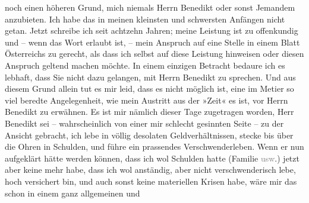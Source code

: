 \begin{ledgroupsized}[t]{13cm}
               noch einen höheren Grund, mich \strikeout{\textcolor{gray}{×}\-\textcolor{gray}{×}\-\textcolor{gray}{×}\-\textcolor{gray}{×}\-\textcolor{gray}{×}\-\textcolor{gray}{×}\-\textcolor{gray}{×}\-\textcolor{gray}{×}\-\textcolor{gray}{×}\-\textcolor{gray}{×}\-\textcolor{gray}{×}\-\textcolor{gray}{×}\-\textcolor{gray}{×}\-\textcolor{gray}{×}\-\textcolor{gray}{×}\-\textcolor{gray}{×}\-\textcolor{gray}{×}\-\textcolor{gray}{×}\-\textcolor{gray}{×}\-\textcolor{gray}{×}} niemals Herrn Benedikt oder sonst
               Jemandem anzubieten. Ich habe das in meinen kleinsten und schwersten Anfängen nicht
               getan. Jetzt schreibe ich seit achtzehn Jahren; meine Leistung ist zu offenkundig und
               – wenn das Wort erlaubt ist, – mein Anspruch auf eine Stelle in einem Blatt Österreichs zu gerecht, als dass ich selbst auf
               diese Leistung hinweisen oder diesen Anspruch geltend machen möchte.\pend
           \pstart
           In einem einzigen Betracht bedaure ich es lebhaft, dass Sie nicht dazu gelangen, mit
               Herrn Benedikt zu sprechen. Und aus diesem
               Grund allein tut es mir leid, dass es nicht möglich ist, eine im Metier so viel
               beredte Angelegenheit, wie mein Austritt aus der »Zeit« es ist, vor Herrn Benedikt zu
               erwähnen. Es ist mir nämlich dieser Tage zugetragen worden, Herr Benedikt sei – wahrscheinlich von einer mir schlecht
               gesinnten Seite – zu der Ansicht gebracht, ich lebe in völlig desolaten
               Geldverhältnissen, stecke bis über die Ohren in Schulden, und führe ein prassendes
               Verschwenderleben. Wenn er nun aufgeklärt hätte werden können, dass ich wol Schulden
               hatte (Familie \textcolor{gray}{usw}.) jetzt aber keine mehr habe, dass ich wol
               anständig, aber nicht verschwenderisch lebe, hoch versichert bin, und auch sonst
               keine materiellen Krisen habe, wäre mir das schon in einem ganz allgemeinen und

\end{ledgroupsized}

